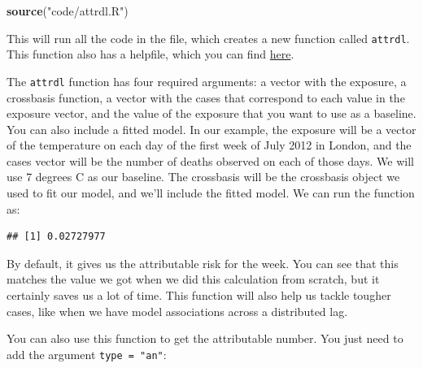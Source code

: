 \documentclass[
]{book}
\newenvironment{Shaded}{\begin{snugshade}}{\end{snugshade}}
\newcommand{\AttributeTok}[1]{\textcolor[rgb]{0.13,0.29,0.53}{#1}}
\newcommand{\DecValTok}[1]{\textcolor[rgb]{0.00,0.00,0.81}{#1}}
\newcommand{\FunctionTok}[1]{\textcolor[rgb]{0.13,0.29,0.53}{\textbf{#1}}}
\newcommand{\NormalTok}[1]{#1}
\newcommand{\SpecialCharTok}[1]{\textcolor[rgb]{0.81,0.36,0.00}{\textbf{#1}}}
\newcommand{\StringTok}[1]{\textcolor[rgb]{0.31,0.60,0.02}{#1}}
\begin{document}
\begin{Shaded}
\begin{Highlighting}[]
\FunctionTok{source}\NormalTok{(}\StringTok{"code/attrdl.R"}\NormalTok{)}
\end{Highlighting}
\end{Shaded}

This will run all the code in the file, which creates a new function called \texttt{attrdl}. This function also has a helpfile, which you can find \href{https://static-content.springer.com/esm/art\%3A10.1186\%2F1471-2288-14-55/MediaObjects/12874_2014_1076_MOESM2_ESM.pdf}{here}.

The \texttt{attrdl} function has four required arguments: a vector with the exposure, a crossbasis function, a vector with the cases that correspond to each value in the exposure vector, and the value of the exposure that you want to use as a baseline. You can also include a fitted model. In our example, the exposure will be a vector of the temperature on each day of the first week of July 2012 in London, and the cases vector will be the number of deaths observed on each of those days. We will use 7 degrees C as our baseline. The crossbasis will be the crossbasis object we used to fit our model, and we'll include the fitted model. We can run the function as:

\begin{Shaded}
\end{Shaded}

\begin{verbatim}
## [1] 0.02727977
\end{verbatim}

By default, it gives us the attributable risk for the week. You can see that this matches the value we got when we did this calculation from scratch, but it certainly saves us a lot of time. This function will also help us tackle tougher cases, like when we have model associations across a distributed lag.

You can also use this function to get the attributable number. You just need to add the argument \texttt{type\ =\ "an"}:
\end{document}
